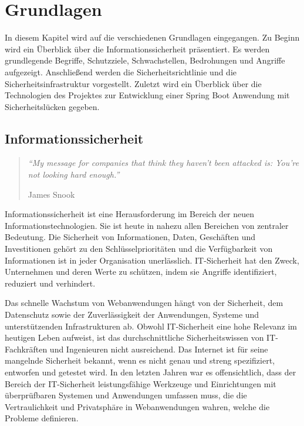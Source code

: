 \chapter{Grundlagen}
\label{cha:k2}

In diesem Kapitel wird auf die verschiedenen Grundlagen eingegangen. Zu Beginn wird ein Überblick über die Informationssicherheit präsentiert. Es werden grundlegende Begriffe, Schutzziele, Schwachstellen, Bedrohungen und Angriffe aufgezeigt. Anschließend werden die Sicherheitsrichtlinie und die Sicherheitsinfrastruktur vorgestellt. Zuletzt wird ein Überblick über die Technologien des Projektes zur Entwicklung einer Spring Boot Anwendung mit Sicherheitslücken gegeben.

\section{Informationssicherheit}

\begin{quote}
	\emph{"`My message for companies that think they haven't been attacked is: You're not looking hard enough."'}
	\begin{flushright}
		James Snook
	\end{flushright}
\end{quote}

Informationssicherheit ist eine Herausforderung im Bereich der neuen Informationstechnologien. Sie ist heute in nahezu allen Bereichen von zentraler Bedeutung. Die Sicherheit von Informationen, Daten, Geschäften und Investitionen gehört zu den Schlüsselprioritäten und die Verfügbarkeit von Informationen ist in jeder Organisation unerlässlich. IT-Sicherheit hat den Zweck, Unternehmen und deren Werte zu schützen, indem sie Angriffe identifiziert, reduziert und verhindert.

Das schnelle Wachstum von Webanwendungen hängt von der Sicherheit, dem Datenschutz sowie der Zuverlässigkeit der Anwendungen, Systeme und unterstützenden Infrastrukturen ab. Obwohl IT-Sicherheit eine hohe Relevanz im heutigen Leben aufweist, ist das durchschnittliche Sicherheitswissen von IT-Fachkräften und Ingenieuren nicht ausreichend. Das Internet ist für seine mangelnde Sicherheit bekannt, wenn es nicht genau und streng spezifiziert, entworfen und getestet wird. In den letzten Jahren war es offensichtlich, dass der Bereich der IT-Sicherheit leistungsfähige Werkzeuge und Einrichtungen mit überprüfbaren Systemen und Anwendungen umfassen muss, die die Vertraulichkeit und Privatsphäre in Webanwendungen wahren, welche die Probleme definieren\cite[1]{furnell2008securing}.

